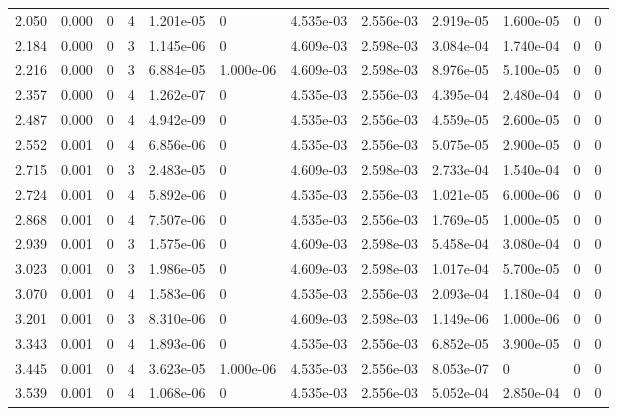 \documentclass[preview]{standalone}
\begin{document}
{{\begin{tabular}{L{1.2cm}C{1.2cm} C{0.3cm}C{0.5cm} C{1.4cm}C{1.4cm} C{1.4cm}C{1.4cm} C{1.6cm}C{1.6cm} C{1.6cm}C{1.6cm}}
  2.050  &  0.000  & 0     &  4 &  1.201e-05  & 0  &  4.535e-03&   2.556e-03& 2.919e-05 & 1.600e-05   &  0 & 0  \\ 
  2.184  &  0.000  & 0     &  3 &  1.145e-06  & 0  &  4.609e-03&   2.598e-03& 3.084e-04 & 1.740e-04   &  0 & 0  \\ 
  2.216  &  0.000  & 0     &  3 &  6.884e-05  & 1.000e-06  &  4.609e-03&   2.598e-03& 8.976e-05 & 5.100e-05   &  0 & 0  \\ 
  2.357  &  0.000  & 0     &  4 &  1.262e-07  & 0  &  4.535e-03&   2.556e-03& 4.395e-04 & 2.480e-04   &  0 & 0  \\ 
  2.487  &  0.000  & 0     &  4 &  4.942e-09  & 0  &  4.535e-03&   2.556e-03& 4.559e-05 & 2.600e-05   &  0 & 0  \\ 
  2.552  &  0.001  & 0     &  4 &  6.856e-06  & 0  &  4.535e-03&   2.556e-03& 5.075e-05 & 2.900e-05   &  0 & 0  \\ 
  2.715  &  0.001  & 0     &  3 &  2.483e-05  & 0  &  4.609e-03&   2.598e-03& 2.733e-04 & 1.540e-04   &  0 & 0  \\ 
  2.724  &  0.001  & 0     &  4 &  5.892e-06  & 0  &  4.535e-03&   2.556e-03& 1.021e-05 & 6.000e-06   &  0 & 0  \\ 
  2.868  &  0.001  & 0     &  4 &  7.507e-06  & 0  &  4.535e-03&   2.556e-03& 1.769e-05 & 1.000e-05   &  0 & 0  \\ 
  2.939  &  0.001  & 0     &  3 &  1.575e-06  & 0  &  4.609e-03&   2.598e-03& 5.458e-04 & 3.080e-04   &  0 & 0  \\ 
  3.023  &  0.001  & 0     &  3 &  1.986e-05  & 0  &  4.609e-03&   2.598e-03& 1.017e-04 & 5.700e-05   &  0 & 0  \\ 
  3.070  &  0.001  & 0     &  4 &  1.583e-06  & 0  &  4.535e-03&   2.556e-03& 2.093e-04 & 1.180e-04   &  0 & 0  \\ 
  3.201  &  0.001  & 0     &  3 &  8.310e-06  & 0  &  4.609e-03&   2.598e-03& 1.149e-06 & 1.000e-06   &  0 & 0  \\ 
  3.343  &  0.001  & 0     &  4 &  1.893e-06  & 0  &  4.535e-03&   2.556e-03& 6.852e-05 & 3.900e-05   &  0 & 0  \\ 
  3.445  &  0.001  & 0     &  4 &  3.623e-05  & 1.000e-06  &  4.535e-03&   2.556e-03& 8.053e-07 & 0   &  0 & 0  \\ 
  3.539  &  0.001  & 0     &  4 &  1.068e-06  & 0  &  4.535e-03&   2.556e-03& 5.052e-04 & 2.850e-04   &  0 & 0  \\ 
\hline 
\end{tabular} 

}}
\end{document}
